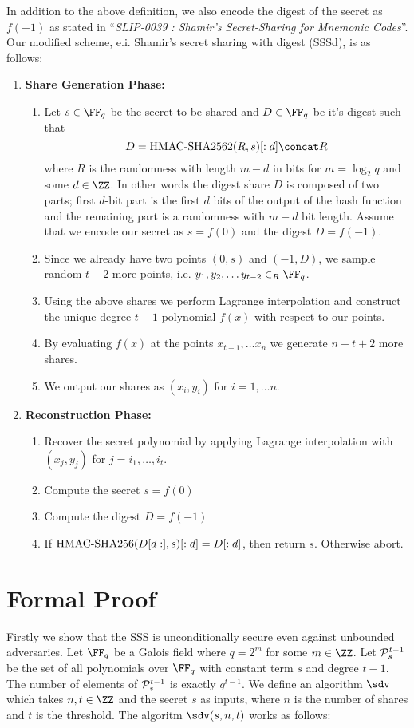 \documentclass[envcountsame,runningheads,notitlepage]{llncs}
\begin{document}
	In addition to the above definition, we also encode the digest of the secret as $f(-1)$ as stated in ``\textit{SLIP-0039 : Shamir's Secret-Sharing for Mnemonic Codes}''. Our modified scheme, e.i. Shamir's secret sharing with digest (SSSd), is as follows:
	\begin{enumerate}
		\item \textbf{Share Generation Phase:}  
		\begin{enumerate}
			\item Let $s \in \FF_q$ be the secret to be shared and $D \in \FF_q$ be it's digest such that 
			\begin{equation*}
			D = \hsha2(R,s)[:d] \concat R
			\end{equation*} 
			where $R$ is the randomness with length $m - d$ in bits for $m = \log_{2}{q}$ and some $d \in \ZZ$. In other words the digest share $D$ is composed of two parts; first $d$-bit part is the first $d$ bits of the output of the hash function and the remaining part is a randomness with $m - d$ bit length. Assume that we encode our secret as $s = f(0)$ and the digest $D = f(-1)$.
			\item Since we already have two points $(0, s)$ and $(-1, D)$, we sample random $t-2$ more points, i.e. $y_{1}, y_{2}, \ldots y_{t-2} \in_{R} \FF_q$.
			\item Using the above shares we perform Lagrange interpolation and construct the unique degree $t - 1$ polynomial $f (x)$ with respect to our points.  
			\item By evaluating $f (x)$ at the points $x_{t - 1}, \ldots x_{n}$ we generate $n - t + 2$ more shares.
			\item We output our shares as $(x_{i},y_{i})$ for $i = 1, \ldots n$.
		\end{enumerate}
		\item \textbf{Reconstruction Phase:}  
		\begin{enumerate}
			\item Recover the secret polynomial by applying Lagrange interpolation with $(x_{j}, y_{j})$ for $j = i_{1}, \ldots, i_{t}$.
			\item Compute the secret $s = f(0)$
			\item Compute the digest $D = f(-1)$
			\item If ${\textrm{HMAC-SHA256}}(D[d:],s)[:d] = D[:d]$, then return $s$. Otherwise abort. 
		\end{enumerate}
	\end{enumerate}
	
	\section{Formal Proof}
	Firstly we show that the SSS is unconditionally secure even against unbounded adversaries.
	Let $\FF_{q}$ be a Galois field where $q = 2^{m}$ for some $m \in \ZZ$. 
	Let ${\mathcal P}_{s}^{t - 1}$ be the set of all polynomials over $\FF_{q}$ with constant term $s$ and degree $t - 1$.
	The number of elements of ${\mathcal P}_{s}^{t - 1}$ is exactly $q^{t-1}$. 
	We define an algorithm $\sdv$ which takes $n, t \in \ZZ$ and the secret $s$ as inputs, where $n$ is the number of shares and $t$ is the threshold. 
	The algoritm $\sdv(s, n, t)$ works as follows:
	
\end{document}
